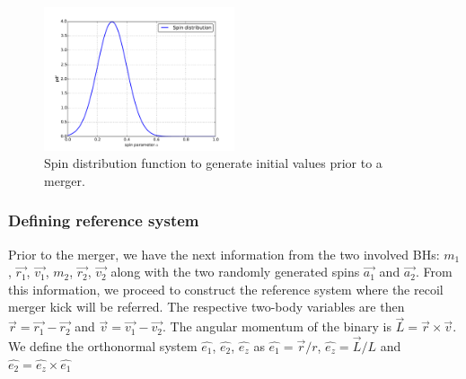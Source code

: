 \documentclass[a4,useAMS,usenatbib,usegraphicx,12pt]{article}
\begin{document}
\begin{figure}[htbp]
\centering
\includegraphics[width=0.50\textwidth]
{./figures/SpinDistribution.pdf}
\caption{\small{Spin distribution function to generate initial values prior to a merger.}}

\label{fig:SpinDistribution}
\end{figure}

\subsubsection{Defining reference system}

Prior to the merger, we have the next information from the two involved BHs: $m_1$, $\vec{r_1}$, 
$\vec{v_1}$, $m_2$, $\vec{r_2}$, $\vec{v_2}$ along with the two randomly generated spins $\vec{a_1}$
and $\vec{a_2}$. From this information, we proceed to construct the reference system where the recoil
merger kick will be referred. The respective two-body variables are then $\vec{r} = \vec{r_1} - 
\vec{r_2}$ and $\vec{v} = \vec{v_1} - \vec{v_2}$. The angular momentum of the binary is $\vec{L} = 
\vec{r}\times\vec{v}$. We define the orthonormal system $\hat{e_1}$, $\hat{e_2}$, $\hat{e_z}$ as 
$\hat{e_1} = \vec{r}/r$, $\hat{e_z} = \vec{L}/L$ and $\hat{e_2} = \hat{e_z}\times\hat{e_1}$

\newpage

\renewcommand{\bibname}{8\ \ \ \ Bibliography}
\small

\end{document}

